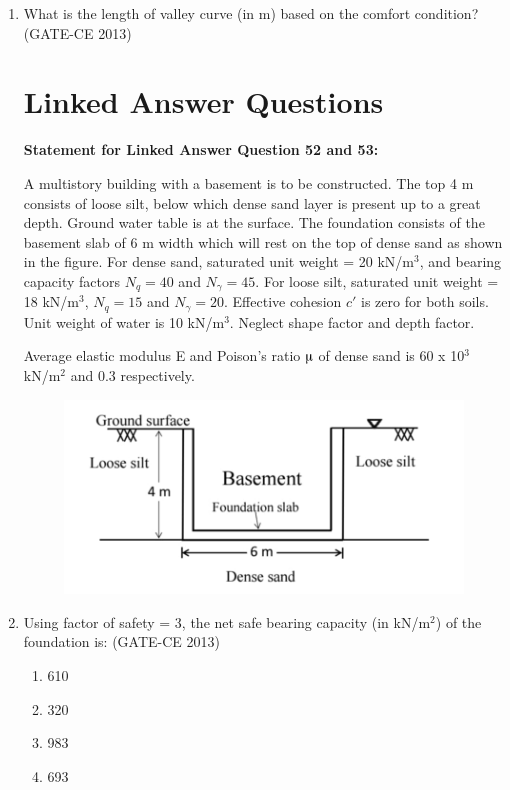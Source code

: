 \documentclass[journal,12pt,onecolumn]{article}
\theoremstyle{remark}
\begin{document}
\begin{enumerate}
    \item What is the length of valley curve (in m) based on the comfort condition? \underline{\hspace{3cm}} (GATE-CE 2013)


\section*{Linked Answer Questions}
    
\textbf{Statement for Linked Answer Question 52 and 53:}


A multistory building with a basement is to be constructed. The top 4 m consists of loose silt, below which dense sand layer is present up to a great depth. Ground water table is at the surface. The foundation consists of the basement slab of 6 m width which will rest on the top of dense sand as shown in the figure. For dense sand, saturated unit weight = 20 kN/m$^3$, and bearing capacity factors $N_q = 40$ and $N_\gamma = 45$. For loose silt, saturated unit weight = 18 kN/m$^3$, $N_q = 15$ and $N_\gamma = 20$. Effective cohesion $c'$ is zero for both soils. Unit weight of water is 10 kN/m$^3$. Neglect shape factor and depth factor.

Average elastic modulus E and Poison's ratio $\micro$ of dense sand is 60 x 10$^3$kN/m$^2$ and 0.3 respectively.

 \begin{figure}[H]
    \centering
    \includegraphics[width=0.7\columnwidth]{figs/image52.jpg}  
    \caption{}
    \label{fig:10}
    \end{figure}

    
    \item Using factor of safety = 3, the net safe bearing capacity (in kN/m$^2$) of the foundation is: (GATE-CE 2013)
    \begin{multicols}{4}
    \begin{enumerate}
        \item 610 
        \item 320 
        \item 983 
        \item 693
    \end{enumerate}
    \end{multicols}
    

\end{enumerate}
\end{document}
